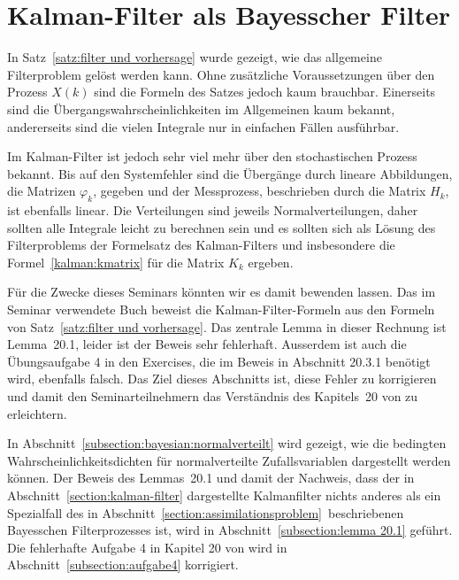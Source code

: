 %
%
%

\newtheorem*{lemma*}{Lemma}

\section{Kalman-Filter als Bayesscher Filter}
In Satz~\ref{satz:filter und vorhersage} wurde gezeigt, wie das allgemeine
Filterproblem gelöst werden kann.
Ohne zusätzliche Voraussetzungen über den Prozess $X(k)$ sind die Formeln
des Satzes jedoch kaum brauchbar.
Einerseits sind die Übergangswahrscheinlichkeiten im Allgemeinen kaum
bekannt, andererseits sind die vielen Integrale nur in einfachen
Fällen ausführbar.

Im Kalman-Filter ist jedoch sehr viel mehr über den stochastischen 
Prozess bekannt.
Bis auf den Systemfehler sind die Übergänge durch lineare Abbildungen,
die Matrizen $\varphi_k$, gegeben und der Messprozess, beschrieben durch
die Matrix $H_k$, ist ebenfalls linear.
Die Verteilungen sind jeweils Normalverteilungen, daher sollten
alle Integrale leicht zu berechnen sein und es sollten sich als Lösung
des Filterproblems der Formelsatz des Kalman-Filters und insbesondere
die Formel~\eqref{kalman:kmatrix} für die Matrix $K_k$ ergeben.

Für die Zwecke dieses Seminars könnten wir es damit bewenden lassen.
Das im Seminar verwendete Buch \cite{skript:kaperengler} beweist die
Kalman-Filter-Formeln aus den Formeln von Satz~\ref{satz:filter und vorhersage}.
Das zentrale Lemma in dieser Rechnung ist Lemma~20.1, leider ist
der Beweis sehr fehlerhaft.
Ausserdem ist auch die Übungsaufgabe 4 in den Exercises, die im Beweis in
Abschnitt 20.3.1 benötigt wird, ebenfalls falsch.
Das Ziel dieses Abschnitts ist, diese Fehler zu korrigieren und damit
den Seminarteilnehmern das Verständnis des Kapitels~20 von
\cite{skript:kaperengler} zu erleichtern.

In Abschnitt~\ref{subsection:bayesian:normalverteilt} wird gezeigt,
wie die bedingten Wahrscheinlichkeitsdichten für normalverteilte
Zufallsvariablen dargestellt werden können.
Der Beweis des Lemmas~20.1 und damit der Nachweis, dass der in
Abschnitt~\ref{section:kalman-filter} dargestellte Kalmanfilter nichts
anderes als ein Spezialfall des in
Abschnitt~\ref{section:assimilationsproblem} beschriebenen Bayesschen
Filterprozesses ist, wird in Abschnitt~\ref{subsection:lemma 20.1}
geführt.
Die fehlerhafte Aufgabe 4 in Kapitel 20 von \cite{skript:kaperengler}
wird in Abschnitt~\ref{subsection:aufgabe4} korrigiert.

